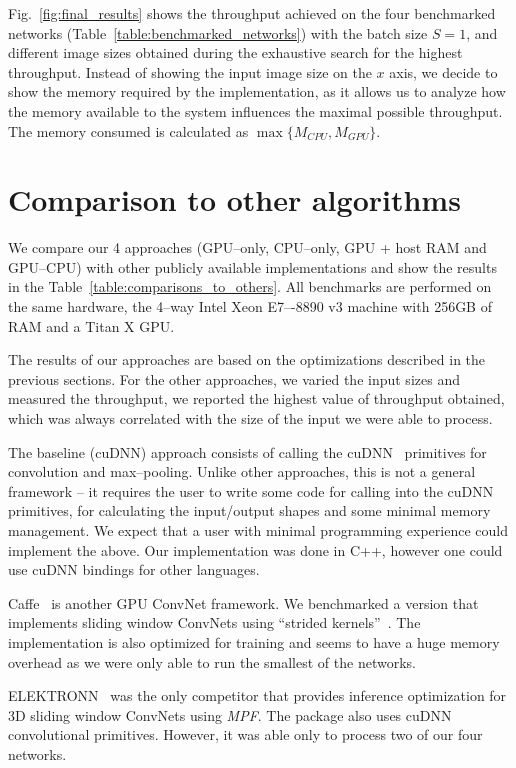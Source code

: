 \documentclass[conference]{./IEEEtran}
\begin{document}
  Fig.~\ref{fig:final_results} shows the throughput achieved on the
  four benchmarked networks (Table~\ref{table:benchmarked_networks})
  with the batch size $S=1$, and different image sizes obtained during
  the exhaustive search for the highest throughput.  Instead of
  showing the input image size on the $x$ axis, we decide to show the
  memory required by the implementation, as it allows us to analyze
  how the memory available to the system influences the maximal
  possible throughput.  The memory consumed is calculated as
  $\max\{M_{CPU},M_{GPU}\}$.


\section{Comparison to other algorithms}

  We compare our 4 approaches (GPU--only, CPU--only, GPU + host RAM
  and GPU--CPU) with other publicly available implementations and show
  the results in the Table~\ref{table:comparisons_to_others}.  All
  benchmarks are performed on the same hardware, the 4--way Intel Xeon
  E7–-8890 v3 machine with 256GB of RAM and a Titan X GPU.

  The results of our approaches are based on the optimizations
  described in the previous sections.  For the other approaches, we
  varied the input sizes and measured the throughput, we reported the
  highest value of throughput obtained, which was always correlated
  with the size of the input we were able to process.

  The baseline (cuDNN) approach consists of calling the
  cuDNN~\cite{chetlur2014cudnn} primitives for convolution and
  max--pooling.  Unlike other approaches, this is not a general
  framework -- it requires the user to write some code for calling
  into the cuDNN primitives, for calculating the input/output shapes
  and some minimal memory management.  We expect that a user with
  minimal programming experience could implement the above.  Our
  implementation was done in C++, however one could use cuDNN bindings
  for other languages.

  Caffe~\cite{jia2014caffe} is another GPU ConvNet framework.  We
  benchmarked a version that implements sliding window ConvNets using
  ``strided kernels''~\cite{tschopp2015efficient}.  The implementation
  is also optimized for training and seems to have a huge memory
  overhead as we were only able to run the smallest of the networks.

  ELEKTRONN~\cite{ELEKTRONN2015} was the only competitor that provides
  inference optimization for 3D sliding window ConvNets using
  \emph{MPF}.  The package also uses cuDNN convolutional primitives.
  However, it was able only to process two of our four networks.
\end{document}
